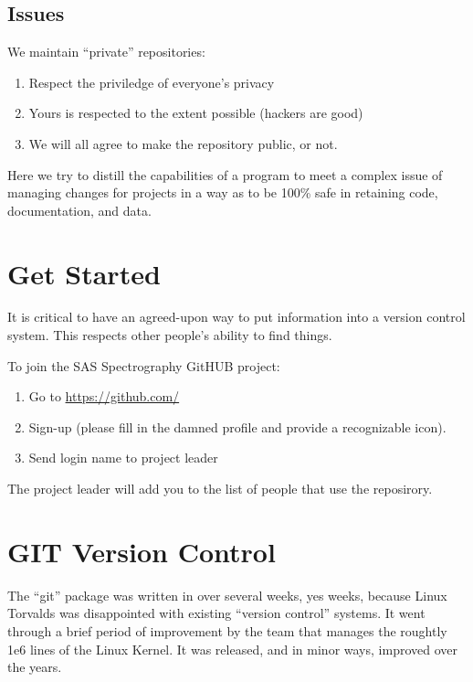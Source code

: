 \documentclass[letter,11pt,oneside]{article}
\begin{document}
\subsection{Issues}

We maintain ``private'' repositories:
\vspace{-.15cm}
\begin{enumerate}\addtolength{\itemsep}{-0.5\baselineskip}
   \item   Respect the priviledge of everyone's privacy
   \item   Yours is respected to the extent possible (hackers are good)
   \item   We will all agree to make the repository public, or not.
\end{enumerate}


Here we try to distill the capabilities of a program to meet a complex
issue of managing changes for projects in a way as to be 100\% safe
in retaining code, documentation, and data.

\newpage

\section{Get Started}

It is critical to have an agreed-upon way to put information into
a version control system. This respects other people's ability to
find things.

To join the SAS Spectrography GitHUB project:

\vspace{-.15cm}
\begin{enumerate}\addtolength{\itemsep}{-0.5\baselineskip}
   \item   Go to \url{https://github.com/}
   \item   Sign-up (please fill in the damned profile and provide a recognizable icon).
   \item   Send login name to project leader
\end{enumerate}

The project leader will add you to the list of people that use the
reposirory.

\section{GIT Version Control}

The ``git'' package was written in over several weeks, yes weeks,
because Linux Torvalds was disappointed with existing ``version
control'' systems. It went through a brief period of improvement
by the team that manages the roughtly 1e6 lines of the Linux Kernel.
It was released, and in minor ways, improved over the years.
\end{document}
